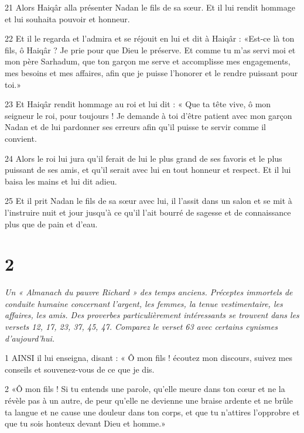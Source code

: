 \par 21 Alors Haiqâr alla présenter Nadan le fils de sa sœur. Et il lui rendit hommage et lui souhaita pouvoir et honneur.

\par 22 Et il le regarda et l'admira et se réjouit en lui et dit à Haiqâr : «Est-ce là ton fils, ô Haiqâr ? Je prie pour que Dieu le préserve. Et comme tu m'as servi moi et mon père Sarhadum, que ton garçon me serve et accomplisse mes engagements, mes besoins et mes affaires, afin que je puisse l'honorer et le rendre puissant pour toi.»

\par 23 Et Haiqâr rendit hommage au roi et lui dit : « Que ta tête vive, ô mon seigneur le roi, pour toujours ! Je demande à toi d'être patient avec mon garçon Nadan et de lui pardonner ses erreurs afin qu'il puisse te servir comme il convient.

\par 24 Alors le roi lui jura qu'il ferait de lui le plus grand de ses favoris et le plus puissant de ses amis, et qu'il serait avec lui en tout honneur et respect. Et il lui baisa les mains et lui dit adieu.

\par 25 Et il prit Nadan le fils de sa sœur avec lui, il l'assit dans un salon et se mit à l'instruire nuit et jour jusqu'à ce qu'il l'ait bourré de sagesse et de connaissance plus que de pain et d'eau.



\chapter{2}

\par \textit{Un « Almanach du pauvre Richard » des temps anciens. Préceptes immortels de conduite humaine concernant l'argent, les femmes, la tenue vestimentaire, les affaires, les amis. Des proverbes particulièrement intéressants se trouvent dans les versets 12, 17, 23, 37, 45, 47. Comparez le verset 63 avec certains cynismes d'aujourd'hui.}

\par 1 AINSI il lui enseigna, disant : « Ô mon fils ! écoutez mon discours, suivez mes conseils et souvenez-vous de ce que je dis.

\par 2 «Ô mon fils ! Si tu entends une parole, qu'elle meure dans ton cœur et ne la révèle pas à un autre, de peur qu'elle ne devienne une braise ardente et ne brûle ta langue et ne cause une douleur dans ton corps, et que tu n'attires l'opprobre et que tu sois honteux devant Dieu et homme.»

